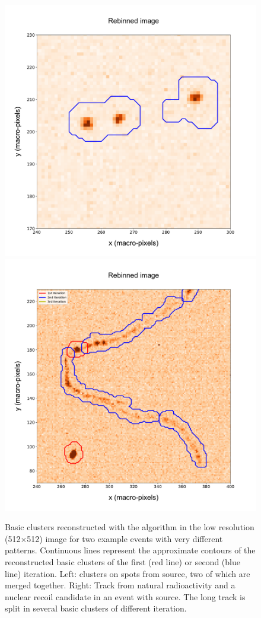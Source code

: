 \begin{figure}[ht]
  \begin{center}
     \includegraphics[width=0.49\linewidth]{figures/pic_run01843_ev93_2nd_3D_paper}
      \includegraphics[width=0.49\linewidth]{figures/pic_run02317_ev8_all_3D_paper}

      \caption{Basic clusters reconstructed with the \idbscan
    algorithm in the low resolution (512$\times$512) image for two
    example events with very different patterns. Continuous lines
    represent the approximate contours of the reconstructed basic
    clusters of the first (red line) or second (blue line) \idbscan
    iteration. Left: clusters on spots from \fe source, two of which
    are merged together. Right: Track from natural radioactivity and a
    nuclear recoil candidate in an event with \ambe source. The long
    track is split in several basic clusters of different \idbscan
    iteration. \label{fig:basic_clusters}}

   \end{center}
\end{figure}
